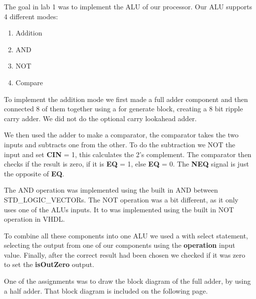 The goal in lab 1 was to implement the ALU of our processor. Our ALU supports 4
different modes:
\begin{enumerate}
    \item Addition
    \item AND
    \item NOT
    \item Compare
\end{enumerate}
To implement the addition mode we first made a full adder component and then
connected 8 of them together using a for generate block, creating a 8 bit ripple
carry adder. We did not do the optional carry lookahead adder.

We then used the adder to make a comparator, the comparator takes the two inputs
and subtracts one from the other. To do the subtraction we NOT the input and set
\textbf{CIN} = 1, this calculates the 2's complement. The comparator then checks
if the result is zero, if it is \textbf{EQ} = 1, else \textbf{EQ} = 0. The
\textbf{NEQ} signal is just the opposite of \textbf{EQ}.

The AND operation was implemented using the built in AND between
STD\_LOGIC\_VECTORs. The NOT operation was a bit different, as it only uses one
of the ALUs inputs. It to was implemented using the built in NOT operation in
VHDL.

To combine all these components into one ALU we used a with select statement,
selecting the output from one of our components using the \textbf{operation}
input value. Finally, after the correct result had been chosen we checked if it
was zero to set the \textbf{isOutZero} output.

One of the assignments was to draw the block diagram of the full adder, by using
a half adder. That block diagram is included on the following page.
